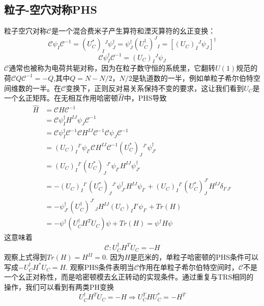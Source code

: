 \documentclass[a4paper]{article}
\numberwithin{equation}{subsection}
\newcommand{\mC}{\mathcal{C}}
\begin{document}
\subsection{粒子-空穴对称PHS}
粒子空穴对称$\mC$是一个混合费米子产生算符和湮灭算符的幺正变换：
\begin{equation}
    \mC\psi_I\mC^{-1}=(U_C^*)_I{}^J\psi_J^\dagger=\psi_J^\dagger(U_C^\dagger)^J{}_I=[(U_C)_I{}^J\psi_J]^\dagger
\end{equation}
\begin{equation}
    \mC\psi_I^\dagger\mC^{-1}=(U_C)_I{}^J\psi_J
\end{equation}
$\mC$通常也被称为电荷共轭对称，因为在粒子数守恒的系统里，它翻转$U(1)$规范的荷$\mC Q\mC^{-1}=-Q$,其中$Q=N-N/2$，$N/2$是轨道数的一半，例如单粒子希尔伯特空间维数的一半。在$\mC$变换下，正则反对易关系保持不变的要求，这让我们看到$U_C$是一个幺正矩阵。在无相互作用哈密顿$\hat{H}$中，PHS导致
\begin{equation}
    \begin{split}
        \hat{H}&=\mC\hat{H}\mC^{-1}\\
        &=\mC\psi_I^\dagger H^{IJ} \psi_J \mC^{-1}\\
        &=\mC\psi_I^\dagger\mC^{-1}\mC H^{IJ}\mC^{-1}\mC\psi_J\mC^{-1}\\
        &=(U_C)_I{}^{I'}\psi_{I'}\mC H^{IJ}\mC^{-1} (U_C^*)_J{}^{J'}\psi_{J'}^\dagger\\
        &=(U_C)_I{}^{I'}(U_C^*)_J{}^{J'}\psi_{I'}H^{IJ}\psi_{J'}^\dagger\\
        &=-(U_C)_I{}^{I'}(U_C^*)_J{}^{J'}\psi_{J'}^\dagger H^{IJ}\psi_{I'}+(U_C)_I{}^{I'}(U_C^*)_J^{J'}H^{IJ}\delta_{I'J'}\\
        &=-\psi_{J'}^\dagger(U_C^\dagger)^{J'}{}_JH^{IJ}(U_C)_I^{}{I'}\psi_{I'}+Tr(H)\\
        &=-\psi^\dagger(U_C^\dagger H^TU_C)\psi+Tr(H)=\psi^\dagger H\psi
    \end{split}
\end{equation}
这意味着
\begin{equation}
    \mC: U_C^\dagger H^T U_C=-H
\end{equation}
观察上式得到$Tr(H)=H^{II}=0$. 因为$H$是厄米的，单粒子哈密顿的PHS条件可以写成$-U_C^\dagger H^*U_C=H$. 观察PHS条件表明当$\mC$作用在单粒子希尔伯特空间时，$\mC$不是一个幺正对称性，而是哈密顿模去幺正转动的实现条件。通过重复与TRS相同的操作，我们可以看到有两类PH变换
\begin{equation}
    U_C^\dagger H^T U_C=-H\Rightarrow U_C^THU_C^*=-H^T
\end{equation}
\end{document}
